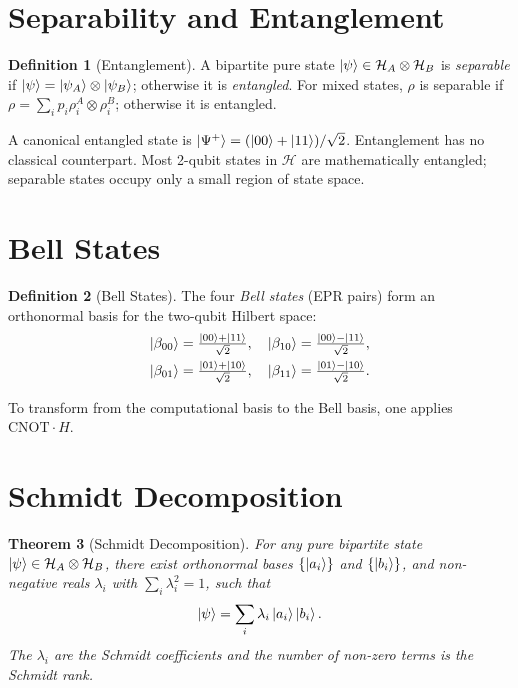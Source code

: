 \documentclass[12pt, a4paper, oneside]{report}
\theoremstyle{plain}
\newtheorem{theorem}{Theorem}[chapter]
\theoremstyle{definition}
\newtheorem{definition}[theorem]{Definition}
\theoremstyle{remark}
\newcommand{\Hcal}{\mathcal{H}}
\newcommand{\CNOT}{\mathrm{CNOT}}
\begin{document}

\section{Separability and Entanglement}

\begin{definition}[Entanglement]
	A bipartite pure state $\ket{\psi} \in \Hcal_A \otimes \Hcal_B$ is \emph{separable} if
	$\ket{\psi} = \ket{\psi_A} \otimes \ket{\psi_B}$; otherwise it is \emph{entangled}. For
	mixed states, $\rho$ is separable if $\rho = \sum_i p_i \rho_i^A \otimes \rho_i^B$;
	otherwise it is entangled.
\end{definition}

A canonical entangled state is $\ket{\Psi^+} = (\ket{00}+\ket{11})/\sqrt{2}$. Entanglement
has no classical counterpart. Most 2-qubit states in $\Hcal$ are mathematically entangled;
separable states occupy only a small region of state space.

\section{Bell States}

\begin{definition}[Bell States]
	The four \emph{Bell states} (EPR pairs) form an orthonormal basis for the two-qubit Hilbert space:
	\begin{align*}
		\ket{\beta_{00}} = \tfrac{\ket{00}+\ket{11}}{\sqrt{2}}, \quad
		\ket{\beta_{10}} = \tfrac{\ket{00}-\ket{11}}{\sqrt{2}}, \\
		\ket{\beta_{01}} = \tfrac{\ket{01}+\ket{10}}{\sqrt{2}}, \quad
		\ket{\beta_{11}} = \tfrac{\ket{01}-\ket{10}}{\sqrt{2}}.
	\end{align*}
\end{definition}

To transform from the computational basis to the Bell basis, one applies $\CNOT \cdot H$.

\section{Schmidt Decomposition}

\begin{theorem}[Schmidt Decomposition]
	\label{thm:schmidt}
	For any pure bipartite state $\ket{\psi} \in \Hcal_A \otimes \Hcal_B$, there exist
	orthonormal bases $\{\ket{a_i}\}$ and $\{\ket{b_i}\}$, and non-negative reals $\lambda_i$
	with $\sum_i \lambda_i^2 = 1$, such that
	\[
		\ket{\psi} = \sum_i \lambda_i \ket{a_i}\ket{b_i}.
	\]
	The $\lambda_i$ are the \emph{Schmidt coefficients} and the number of non-zero terms is the
	\emph{Schmidt rank}.
\end{theorem}
\end{document}
